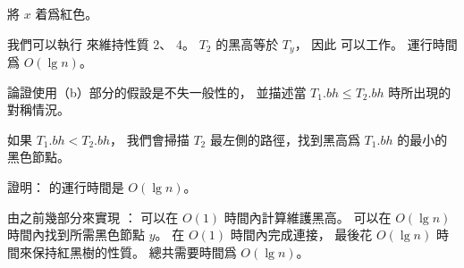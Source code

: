 \startANSWER
將 $x$ 着爲紅色。

我們可以執行  來維持性質 2、 4。
 $T_2$ 的黑高等於 $T_y$，
因此  可以工作。
運行時間爲 $O(\lg n)$。
\stopANSWER

\startigBase[a,continue]\startitem%
論證使用（b）部分的假設是不失一般性的，
並描述當 $T_1.bh\le T_2.bh$ 時所出現的對稱情況。
\stopitem\stopigBase

\startANSWER
如果 $T_1.bh < T_2.bh$，
我們會掃描 $T_2$ 最左側的路徑，找到黑高爲 $T_1.bh$ 的最小的黑色節點。
\stopANSWER

\startigBase[a,continue]\startitem%
證明：  的運行時間是 $O(\lg n)$。
\stopitem\stopigBase

\startANSWER
由之前幾部分來實現 ：
可以在 $O(1)$ 時間內計算維護黑高。
可以在 $O(\lg n)$ 時間內找到所需黑色節點 $y$。
在 $O(1)$ 時間內完成連接，
最後花 $O(\lg n)$ 時間來保持紅黑樹的性質。
總共需要時間爲 $O(\lg n)$。
\stopANSWER

\stopPROBLEM
